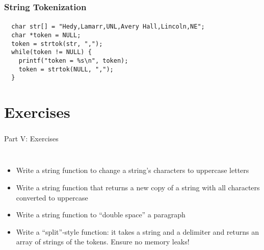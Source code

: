 \documentclass[]{beamer}
\begin{document}
\begin{frame}[fragile]
    \frametitle{String Tokenization}
    \framesubtitle{}
    
\begin{verbatim}
  char str[] = "Hedy,Lamarr,UNL,Avery Hall,Lincoln,NE";
  char *token = NULL;
  token = strtok(str, ",");
  while(token != NULL) {
    printf("token = %s\n", token);
    token = strtok(NULL, ",");
  }
\end{verbatim}

\end{frame}

\section{Exercises}

\begin{frame}
    \frametitle{}
    \framesubtitle{}
    
    \begin{center}
    {\Huge Part V: Exercises}\\
    {\Large ~}
    
    \end{center}

\end{frame}


\begin{frame}
    \frametitle{}
    \framesubtitle{}
    
\begin{itemize}
  \item Write a string function to change a string's characters to uppercase letters
  \item Write a string function that returns a new copy of a string with all characters converted to uppercase
  \item Write a string function to ``double space'' a paragraph %
  \item Write a ``split''-style function: it takes a string and a delimiter 
  and returns an array of strings of the tokens.  Ensure no memory leaks!
\end{itemize}

\end{frame}
\end{document}
